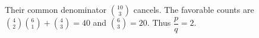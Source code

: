 Their common denominator $\binom{10}3$ cancels. The favorable counts are $\binom42\binom61+\binom43=40$ and $\binom63=20$. Thus $\boxed{\dfrac{p}{q}=2}$.

